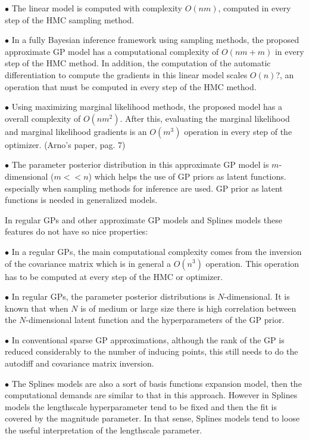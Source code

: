 \documentclass[]{interact}
\theoremstyle{plain}%
\theoremstyle{definition}
\theoremstyle{remark}
\begin{document}
\vspace{2mm}
$\bullet$ The linear model is computed with complexity $O(nm)$, computed in every step of the HMC sampling method.

\vspace{2mm}
$\bullet$ In a fully Bayesian inference framework using sampling methods, the proposed approximate GP model has a computational complexity of $O(nm+m)$ in every step of the HMC method. In addition, the computation of the automatic differentiation to compute the gradients in this linear model scales $O(n)$?, an operation that must be computed in every step of the HMC method.

\vspace{2mm}
$\bullet$ Using maximizing marginal likelihood methods, the proposed model has a overall complexity of $O(nm^2)$. After this, evaluating the marginal likelihood and marginal likelihood gradients is an $O(m^3)$ operation in every step of the optimizer. (Arno's paper, pag. 7)

\vspace{2mm}
$\bullet$ The parameter posterior distribution in this approximate GP model is $m$-dimensional ($m<<n$) which helps the use of GP priors as latent functions. especially when sampling methods for inference are used. GP prior as latent functions is needed in generalized models.

In regular GPs and other approximate GP models and Splines models these features do not have so nice properties:

\vspace{2mm}
$\bullet$ In a regular GPs, the main computational complexity comes from the inversion of the covariance matrix which is in general a $O(n^3)$ operation. This operation has to be computed at every step of the HMC or optimizer.

\vspace{2mm}
$\bullet$ In regular GPs, the parameter posterior distributions is $N$-dimensional. It is known that when $N$ is of medium or large size there is high correlation between the $N$-dimensional latent function and the hyperparameters of the GP prior.

\vspace{2mm}
$\bullet$ In conventional sparse GP approximations, although the rank of the GP is reduced considerably to the number of inducing points, this still needs to do the autodiff and covariance matrix inversion.

\vspace{2mm}
$\bullet$ The Splines models are also a sort of basis functions expansion model, then the computational demands are similar to that in this approach. However in Splines models the lengthscale hyperparameter tend to be fixed and then the fit is covered by the magnitude parameter. In that sense, Splines models tend to loose the useful interpretation of the lengthscale parameter.
\end{document}
